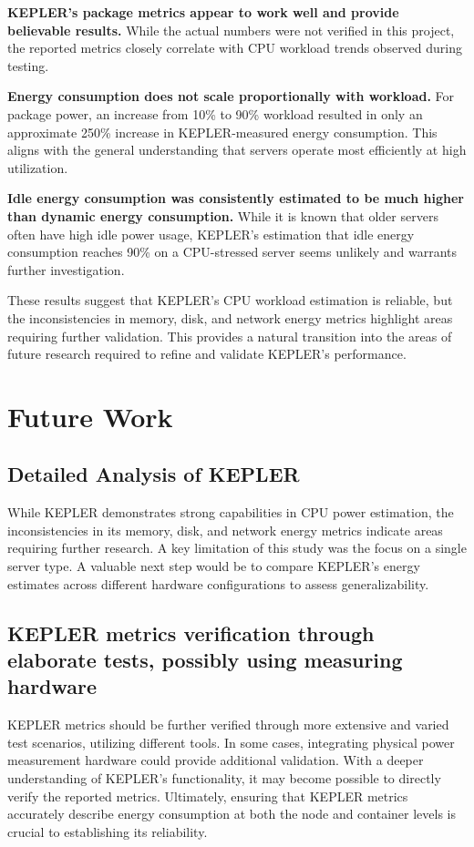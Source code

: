 \textbf{KEPLER’s package metrics appear to work well and provide believable results.} While the actual numbers were not verified in this project, the reported metrics closely correlate with CPU workload trends observed during testing.

\textbf{Energy consumption does not scale proportionally with workload.} For package power, an increase from 10\% to 90\% workload resulted in only an approximate 250\% increase in KEPLER-measured energy consumption. This aligns with the general understanding that servers operate most efficiently at high utilization.

\textbf{Idle energy consumption was consistently estimated to be much higher than dynamic energy consumption.} While it is known that older servers often have high idle power usage, KEPLER’s estimation that idle energy consumption reaches 90\% on a CPU-stressed server seems unlikely and warrants further investigation.

These results suggest that KEPLER’s CPU workload estimation is reliable, but the inconsistencies in memory, disk, and network energy metrics highlight areas requiring further validation. This provides a natural transition into the areas of future research required to refine and validate KEPLER’s performance.

\section{Future Work}

\subsection{Detailed Analysis of KEPLER}

While KEPLER demonstrates strong capabilities in CPU power estimation, the inconsistencies in its memory, disk, and network energy metrics indicate areas requiring further research. A key limitation of this study was the focus on a single server type. A valuable next step would be to compare KEPLER’s energy estimates across different hardware configurations to assess generalizability.

\subsection{KEPLER metrics verification through elaborate tests, possibly using measuring hardware}

KEPLER metrics should be further verified through more extensive and varied test scenarios, utilizing different tools. In some cases, integrating physical power measurement hardware could provide additional validation. With a deeper understanding of KEPLER’s functionality, it may become possible to directly verify the reported metrics. Ultimately, ensuring that KEPLER metrics accurately describe energy consumption at both the node and container levels is crucial to establishing its reliability.

